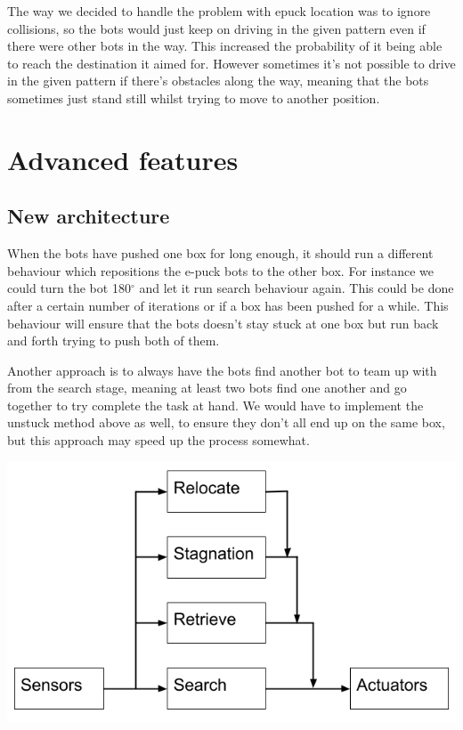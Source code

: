\documentclass[12pt, a4paper]{article}
\begin{document}
The way we decided to handle the problem with epuck location was to ignore collisions, so the bots would just keep on driving in the given pattern even if there were other bots in the way. This increased the probability of it being able to reach the destination it aimed for. However sometimes it's not possible to drive in the given pattern if there's obstacles along the way, meaning that the bots sometimes just stand still whilst trying to move to another position.

\section{Advanced features}

\subsection{New architecture}
When the bots have pushed one box for long enough, it should run a different behaviour which repositions the e-puck bots to the other box. For instance we could turn the bot 180$^{\circ}$ and let it run search behaviour again. This could be done after a certain number of iterations or if a box has been pushed for a while. This behaviour will ensure that the bots doesn't stay stuck at one box but run back and forth trying to push both of them.

Another approach is to always have the bots find another bot to team up with from the search stage, meaning at least two bots find one another and go together to try complete the task at hand. We would have to implement the unstuck method above as well, to ensure they don't all end up on the same box, but this approach may speed up the process somewhat. 

\includegraphics[width=\linewidth]{Brooks-lite-extended.png}
\end{document}
